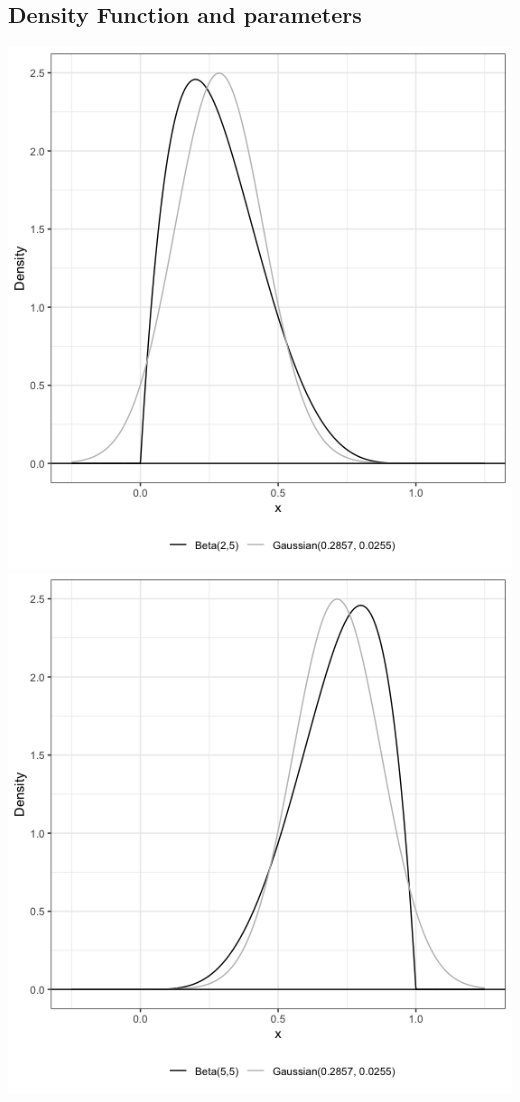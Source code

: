 \documentclass{article}\usepackage[]{graphicx}\usepackage[]{xcolor}
\begin{document}
\subsection{Density Function and parameters}
\includegraphics[scale=0.3]{beta distribution with alpha 2 beta 5.png}
\includegraphics[scale=0.3]{beta distribution with alpha 5 beta 5.png}\\
\end{document}
